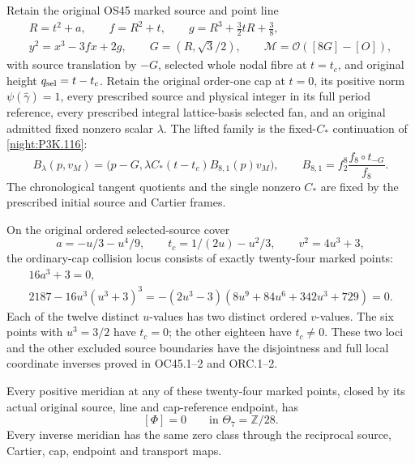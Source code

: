 \begin{theorem}\label{night:P3K.119}
Retain the original OS45 marked source and point line
\[
\begin{gathered}
R=t^2+a,\qquad f=R^2+t,\qquad
g=R^3+\frac32tR+\frac38,\\
y^2=x^3-3fx+2g,\qquad G=(R,\sqrt3/2),\qquad
\mathcal M=\mathcal O([8G]-[O]),
\end{gathered}
\]
with source translation by \(-G\), selected whole nodal fibre at
\(t=t_c\), and original height \(q_{\rm sel}=t-t_c\). Retain the
original order-one cap at \(t=0\), its positive norm
\(\psi(\widehat\gamma)=1\), every prescribed source and physical
integer in its full period reference, every prescribed integral
lattice-basis selected fan, and an original admitted fixed nonzero
scalar \(\lambda\).
The lifted family is the fixed-$C_*$ continuation of
\cref{night:P3K.116}:
\[
 B_\lambda(p,v_M)=
 \bigl(p-G,\lambda C_*(t-t_c)B_{8,1}(p)v_M\bigr),
 \qquad B_{8,1}=f_2^8\frac{f_8\circ t_{-G}}{f_8}.
\]
The chronological tangent quotients and the single nonzero $C_*$
are fixed by the prescribed initial source and Cartier frames.

On the original ordered selected-source cover
\[
a=-u/3-u^4/9,\qquad t_c=1/(2u)-u^2/3,\qquad
v^2=4u^3+3,
\]
the ordinary-cap collision locus consists of exactly twenty-four
marked points:
\[
\begin{gathered}
16a^3+3=0,\\
2187-16u^3(u^3+3)^3
=-(2u^3-3)(8u^9+84u^6+342u^3+729)=0.
\end{gathered}
\]
Each of the twelve distinct \(u\)-values has two distinct ordered
\(v\)-values. The six points with \(u^3=3/2\) have \(t_c=0\);
the other eighteen have \(t_c\ne0\). These two loci and the other
excluded source boundaries have the disjointness and full local
coordinate inverses proved in OC45.1--2 and ORC.1--2.

Every positive meridian at any of these twenty-four marked points,
closed by its actual original source, line and cap-reference
endpoint, has
\[
[\Phi]=0\qquad\text{in }\Theta_7=\mathbb Z/28.
\]
Every inverse meridian has the same zero class through the
reciprocal source, Cartier, cap, endpoint and transport maps.


\end{theorem}
